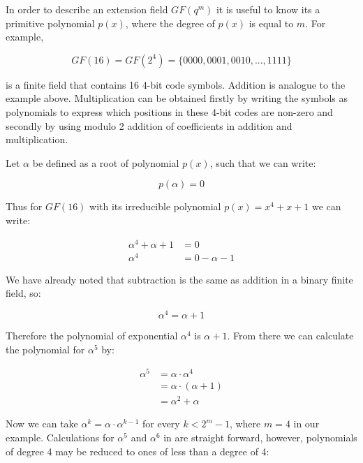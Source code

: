 \documentclass[../main.tex]{subfiles}
\begin{document}
    In order to describe an extension field ${GF(q^m)}$ it is useful to know its a primitive polynomial ${p(x)}$, where the degree of ${p(x)}$ is equal to ${m}$. For example,

    \begin{equation*}
         GF(16) = GF(2^4) = \{0000, 0001, 0010, ..., 1111\}
    \end{equation*}

    \noindent
    is a finite field that contains 16 4-bit code symbols. Addition is analogue to the example above. Multiplication can be obtained firstly by writing the symbols as polynomials to express which positions in these 4-bit codes are non-zero and secondly by using modulo 2 addition of coefficients in addition and multiplication.

    \noindent
    Let ${\alpha}$ be defined as a root of polynomial ${p(x)}$, such that we can write:

    \begin{equation*}
         p(\alpha) = 0
    \end{equation*}

    \noindent
    Thus for ${GF(16)}$ with its irreducible polynomial ${p(x) = x^4 + x + 1}$ we can write:

    \begin{align*}
        \alpha^4 + \alpha + 1 &= 0 \\
        \alpha^4 &= 0 - \alpha - 1
    \end{align*}

    \noindent
    We have already noted that subtraction is the same as addition in a binary finite field, so:

    \begin{equation*}
        \alpha^4 = \alpha + 1
    \end{equation*}

    \noindent
    Therefore the polynomial of exponential ${\alpha^4}$ is ${\alpha + 1}$. From there we can calculate the polynomial for ${\alpha^5}$ by:

    \begin{align*}
        \alpha^5 &= \alpha \cdot \alpha^4 \\
                 &= \alpha \cdot (\alpha + 1) \\
                 &= \alpha^2 + \alpha
    \end{align*}

    \noindent
    Now we can take ${\alpha^k = \alpha \cdot \alpha^{k - 1}}$ for every ${k < 2^m - 1}$, where ${m = 4}$ in our example. Calculations for ${\alpha^5}$ and ${\alpha^6}$ in  are straight forward, however, polynomials of degree 4 may be reduced to ones of less than a degree of 4:
\end{document}
